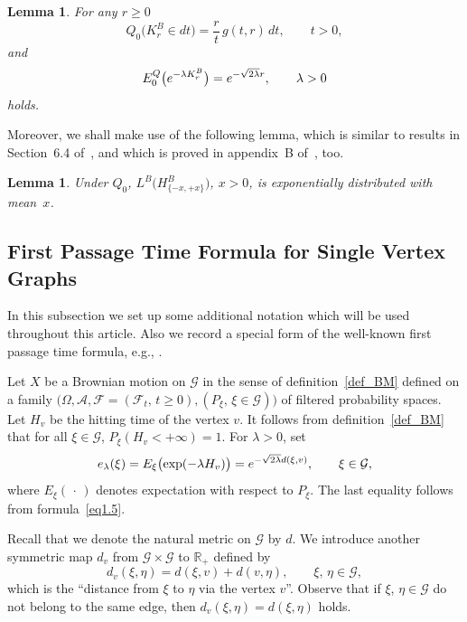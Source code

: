 \documentclass[11pt,a4paper]{amsart}
\newcommand{\gl}{\lambda}
\newcommand{\gO}{\Omega}
\newcommand{\cA}{\mathcal{A}}
\newcommand{\cF}{\mathcal{F}}
\newcommand{\cG}{\mathcal{G}}
\newcommand{\1}{1}
\newcommand{\R}{\mathbb{R}}
\newtheorem{lemma}[theorem]{Lemma}
\theoremstyle{remark}
\newcommand{\sgl}{\ensuremath\sqrt{2\gl}}
\numberwithin{equation}{section}
\begin{document}
\begin{lemma}   \label{lem1.2}
For any $r\ge 0$
\begin{equation}    \label{eq1.12}
    Q_0\bigl(K^B_r\in dt\bigr) = \frac{r}{t}\,g(t,r)\,dt,\qquad t>0,
\end{equation}
and
\begin{equation}    \label{eq1.13}
    E^Q_0\bigl(e^{-\gl K^B_r}\bigr) = e^{-\sgl r},\qquad \gl>0
\end{equation}
holds.
\end{lemma}

Moreover, we shall make use of the following lemma, which is similar to results
in Section~6.4 of~\cite{KaSh91}, and which is proved in appendix~B
of~\cite{BMMG0}, too.

\begin{lemma}   \label{lem1.3}
Under $Q_0$, $L^B\bigl(H^B_{\{-x,+x\}}\bigr)$, $x>0$, is exponentially distributed
with mean~$x$.
\end{lemma}

\subsection{First Passage Time Formula for Single Vertex Graphs} \label{ssect1.3}
In this subsection we set up some additional notation which will be used throughout
this article. Also we record a special form of the well-known first passage time formula,
e.g., \cite{Ra56,ItMc74}.

Let $X$ be a Brownian motion on $\cG$ in the sense of definition~\ref{def_BM}
defined on a family $\bigl(\gO,\cA, \cF=(\cF_t,\,t\ge 0), (P_\xi,\,\xi\in\cG)\bigr)$
of filtered probability spaces. Let $H_v$ be the hitting time of the vertex $v$.
It follows from definition~\ref{def_BM} that for all $\xi\in\cG$, $P_\xi(H_v<+\infty)=1$.
For $\gl>0$, set
\begin{equation}    \label{eq1.14}
    e_\gl(\xi) = E_\xi\bigl(\exp(-\gl H_v)\bigr) = e^{-\sgl d(\xi,v)},\qquad \xi\in\cG,
\end{equation}
where $E_\xi(\,\cdot\,)$ denotes expectation with respect to $P_\xi$. The last
equality follows from formula~\eqref{eq1.5}.

Recall that we denote the natural metric on $\cG$ by $d$. We introduce another
symmetric map $d_v$ from $\cG\times\cG$ to $\R_+$ defined by
\begin{equation}    \label{eq1.15}
    d_v(\xi,\eta) = d(\xi,v) + d(v,\eta),\qquad \xi,\,\eta\in\cG,
\end{equation}
which is the ``distance from $\xi$ to $\eta$ via the vertex $v$''. Observe that if
$\xi$, $\eta\in\cG$ do not belong to the same edge, then $d_v(\xi,\eta)=d(\xi,\eta)$ holds.
\end{document}
